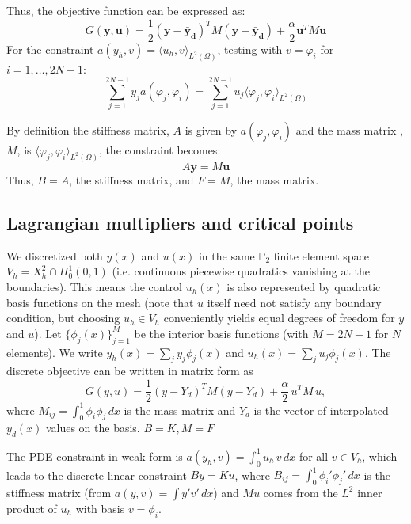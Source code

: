 \documentclass[a4paper,10pt]{article}
\begin{document}
Thus, the objective function can be expressed as:
\[
	G(\mathbf{y},\mathbf{u}) = \frac{1}{2}(\mathbf{y}-\mathbf{\bar{y}_d})^T M (\mathbf{y}-\mathbf{\bar{y}_d}) + \frac{\alpha}{2} \mathbf{u}^T M \mathbf{u}
\]
For the constraint \(a(y_h,v) = \langle u_h,v \rangle_{L^2(\Omega)}\), testing with \(v = \varphi_i\) for \(i=1,\dots,2N-1\):
\[
	\sum_{j=1}^{2N-1} y_j a(\varphi_j,\varphi_i) = \sum_{j=1}^{2N-1} u_j \langle \varphi_j,\varphi_i \rangle_{L^2(\Omega)}
\]

By definition the stiffness matrix, \(A\) is given by \(a(\varphi_j,\varphi_i)\) and the mass matrix ,\(M\), is \(\langle \varphi_j,\varphi_i \rangle_{L^2(\Omega)}\), the constraint becomes:
\[
	A \mathbf{y} = M \mathbf{u}
\]
 Thus, \(B = A\), the stiffness matrix, and \(F = M\), the mass matrix.

\subsection{Lagrangian multipliers and critical points}
We discretized both $y(x)$ and $u(x)$ in the same $\mathbb{P}_2$ finite element space $V_h = X_h^2 \cap H_0^1(0,1)$ (i.e. continuous piecewise quadratics vanishing at the boundaries). This means the control $u_h(x)$ is also represented by quadratic basis functions on the mesh (note that $u$ itself need not satisfy any boundary condition, but choosing $u_h\in V_h$ conveniently yields equal degrees of freedom for $y$ and $u$). Let $\{\phi_j(x)\}_{j=1}^{M}$ be the interior basis functions (with $M=2N-1$ for $N$ elements). We write $y_h(x)=\sum_j y_j\phi_j(x)$ and $u_h(x)=\sum_j u_j\phi_j(x)$. The discrete objective can be written in matrix form as
\[
	G(y,u) = \frac{1}{2}(y-Y_d)^T M(y-Y_d) + \frac{\alpha}{2}\,u^T M\,u,
\]
where $M_{ij}=\int_0^1 \phi_i\phi_j\,dx$ is the mass matrix and $Y_d$ is the vector of interpolated $y_d(x)$ values on the basis. $B = K, M = F$

The PDE constraint in weak form is $a(y_h,v) = \int_0^1 u_h\,v\,dx$ for all $v\in V_h$, which leads to the discrete linear constraint $By = Ku$, where $B_{ij}=\int_0^1 \phi_i'\phi_j'\,dx$ is the stiffness matrix (from $a(y,v)=\int y'v'\,dx$) and $Mu$ comes from the $L^2$ inner product of $u_h$ with basis $v=\phi_i$.
\end{document}
